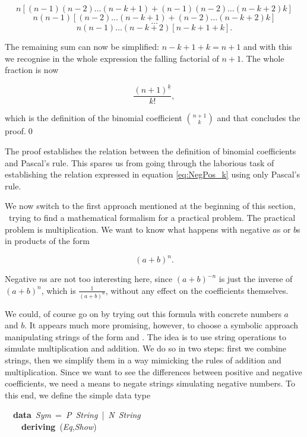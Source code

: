 \documentclass[tikz]{scrreprt}
\newcommand{\texfamily}{\fontfamily{cmtex}\selectfont}
\begin{document}
\begin{minipage}{\textwidth}
\[
n[(n-1)(n-2)\dots (n-k+1) + (n-1)(n-2)\dots (n-k+2)k]
\]
\[
n(n-1)[(n-2)\dots (n-k+1) + (n-2)\dots (n-k+2)k]
\]
\[
\dots
\]
\[
n(n-1)\dots(n-k+2)[n-k+1+k].
\]
\end{minipage}

The remaining sum can now be simplified:
$n-k+1+k = n+1$ and with this 
we recognise in the whole expression
the falling factorial of $n+1$.
The whole fraction is now 

\[
\frac{(n+1)^{\underline{k}}}{k!},
\]

which is the definition of the binomial coefficient
$\binom{n+1}{k}$ and that concludes the proof.\qed

The proof establishes the relation between
the definition of binomial coefficients and
Pascal's rule. This spares us from going
through the laborious task of establishing
the relation expressed in equation \ref{eq:NegPos_k}
using only Pascal's rule.

We now switch to the first approach mentioned 
at the beginning of this section,
\ie\ trying to find a mathematical
formalism for a practical problem.
The practical problem is multiplication.
We want to know what happens
with negative $a$s or $b$s in products of the form

\[
(a + b)^n.
\]

Negative $n$s are not too interesting here,
since $(a+b)^{-n}$ is just the inverse of
$(a+b)^n$, which is $\frac{1}{(a+b)^n}$,
without any effect on the coefficients themselves.

We could, of course go on by trying out
this formula with concrete numbers $a$ and $b$.
It appears much more promising, however, to choose a 
symbolic approach manipulating strings of the form
\text{\texfamily \char34 a\char34 } and \text{\texfamily \char34 b\char34 }.
The idea is to use string operations to simulate
multiplication and addition.
We do so in two steps: first we combine strings,
then we simplify them in a way mimicking the 
rules of addition and multiplication.
Since we want to see the differences between
positive and negative coefficients, 
we need a means to negate strings simulating
negative numbers.
To this end, we define the simple data type

\begin{minipage}{\textwidth}
\begin{tabbing}\texfamily
~~{\bfseries data}~{\itshape Sym}~=~{\itshape P}~{\itshape String}~|~{\itshape N}~{\itshape String}\\
\texfamily ~~~~{\bfseries deriving}~({\itshape Eq},{\itshape Show})
\end{tabbing}
\end{minipage}
\end{document}
